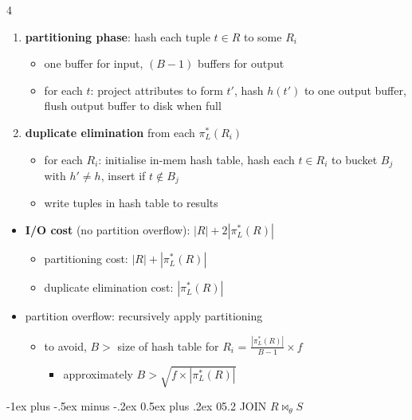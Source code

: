\documentclass{article}
\makeatletter
\renewcommand{\section}{\@startsection{section}{1}{0mm}%
    {-1ex plus -.5ex minus -.2ex}%
    {0.5ex plus .2ex}%
{\normalfont\small\bfseries}}
\makeatother
\begin{document}
\begin{multicols*}{4}
\begin{scriptsize}
  \begin{enumerate}
    \item \textbf{partitioning phase}: hash each tuple $t \in R$ to some $R_i$
      \begin{itemize}
        \item one buffer for input, $(B-1)$ buffers for output
        \item for each $t$: project attributes to form $t'$, hash $h(t')$ to one output buffer, flush output buffer to disk when full
      \end{itemize}
    \item \textbf{duplicate elimination} from each $\pi^*_L(R_i)$
      \begin{itemize}
        \item for each $R_i$: initialise in-mem hash table, hash each $t \in R_i$ to bucket $B_j$ with $h' \neq h$, insert if $t \not\in B_j$
        \item write tuples in hash table to results
      \end{itemize}
  \end{enumerate}

  \begin{itemize}
    \item \textbf{I/O cost} (no partition overflow): $|R| + 2|\pi^*_L(R)|$
      \begin{itemize}
        \item partitioning cost: $|R| + |\pi^*_L(R)|$
        \item duplicate elimination cost: $|\pi^*_L(R)|$
      \end{itemize}
    \item partition overflow: recursively apply partitioning
      \begin{itemize}
        \item to avoid, $B>$ size of hash table for $R_i$ = $\frac{|\pi^*_L(R)|}{B-1} \times f$
          \begin{itemize}
            \item  approximately $B> \sqrt{f\times |\pi^*_L(R)|}$
          \end{itemize}
      \end{itemize}
  \end{itemize}

  \section{05.2 JOIN $R \bowtie_\theta S$}


\end{scriptsize}
\end{multicols*}
\end{document}
